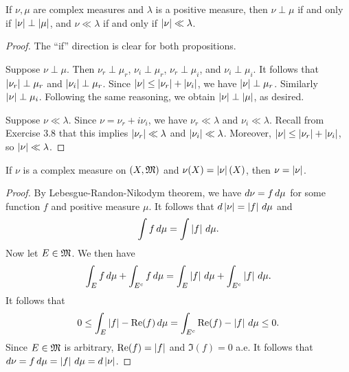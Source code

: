 \documentclass[a4paper]{article}
\begin{document}
\begin{ex}[Folland 3.19]
If $\nu, \mu$ are complex measures and $\lambda$ 
is a positive measure, then $\nu \perp \mu$ if and only 
if $\left\lvert \nu\right\rvert \perp \left\lvert \mu\right\rvert$, and $\nu \ll \lambda$ 
if and only if $\left\lvert \nu\right\rvert \ll \lambda$.
\end{ex}

\begin{proof}
The ``if'' direction is clear for both propositions.

Suppose $\nu \perp \mu$. Then $\nu_r \perp \mu_r$,
$\nu_i \perp \mu_r$, $\nu_r \perp \mu_i$, and $\nu_i \perp \mu_i$.
It follows that $\left\lvert \nu_r\right\rvert \perp \mu_r$ and $\left\lvert \nu_i\right\rvert
\perp \mu_r$. Since $\left\lvert \nu\right\rvert \leq \left\lvert \nu_r\right\rvert + \left\lvert \nu_i\right\rvert$, 
we have $\left\lvert \nu\right\rvert \perp \mu_r$. Similarly $\left\lvert \nu\right\rvert \perp \mu_i$.
Following the same reasoning, we obtain 
$\left\lvert \nu\right\rvert \perp \left\lvert \mu\right\rvert$, as desired.

Suppose $\nu \ll \lambda$. 
Since $\nu = \nu_r + i \nu_i$, we have 
$\nu_r \ll \lambda$ and $\nu_i \ll \lambda$. 
Recall from Exercise 3.8 that this implies $\left\lvert \nu_r\right\rvert \ll 
\lambda$ and $\left\lvert \nu_i\right\rvert \ll \lambda$. Moreover, 
$\left\lvert \nu\right\rvert \leq \left\lvert \nu_r\right\rvert + \left\lvert \nu_i\right\rvert$, so 
$\left\lvert \nu\right\rvert \ll \lambda$.
\end{proof}

\begin{ex}[Folland 3.20]
If $\nu$ is a complex measure on $(X, \mathfrak{M})$ and 
$\nu(X) = \left\lvert \nu\right\rvert(X)$, then $\nu = \left\lvert \nu\right\rvert$.
\end{ex}

\begin{proof}
By Lebesgue-Randon-Nikodym theorem, we have 
$d \nu = f \, d \mu$ for some function $f$ and positive 
measure $\mu$. It follows that $d \left\lvert \nu\right\rvert 
= \left\lvert f\right\rvert \, d \mu$ and 
\[
\int f \, d \mu = \int \left\lvert f\right\rvert \, d \mu.
\]
Now let $E \in \mathfrak{M}$. We then have 
\[
\int_E f \, d \mu + \int_{E^c} f \, d \mu = 
\int_E \left\lvert f\right\rvert \, d \mu + \int_{E^c} \left\lvert f\right\rvert \, d \mu.
\]
It follows that 
\[
0 \leq \int_{E} \left\lvert f\right\rvert - \operatorname{Re} (f) \, d \mu
= \int_{E^c} \operatorname{Re} (f) - \left\lvert f\right\rvert \, d \mu \leq 0.
\]
Since $E \in \mathfrak{M}$ is arbitrary, 
$\operatorname{Re} (f) = \left\lvert f\right\rvert$ and $\Im (f) = 0$ a.e. It follows that 
$d \nu = f \, d \mu = \left\lvert f\right\rvert \, d \mu = d \left\lvert \nu\right\rvert$.
\end{proof}
\end{document}
